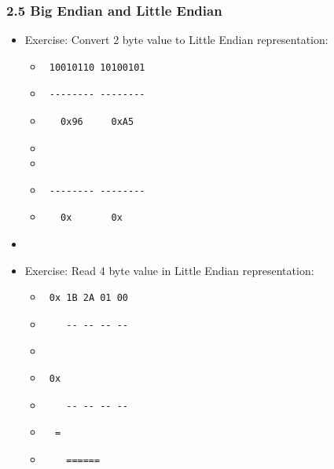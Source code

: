 \begin{frame}[fragile]
  \frametitle{2.5 Big Endian and Little Endian}
    \begin{itemize}
        \item[] Exercise: Convert 2 byte value to Little Endian representation:
            \begin{itemize}
                \item[] \begin{verbatim} 10010110 10100101\end{verbatim}
                \item[] \begin{verbatim} -------- --------\end{verbatim}
                \item[] \begin{verbatim}   0x96     0xA5   \end{verbatim}
                \item[] 
                \item[] 
                \item[] \begin{verbatim} -------- --------\end{verbatim}
                \item[] \begin{verbatim}   0x       0x     \end{verbatim}
            \end{itemize}
        \item[] 
        \item[] Exercise: Read 4 byte value in Little Endian representation:
            \begin{itemize}
                \item[] \begin{verbatim} 0x 1B 2A 01 00\end{verbatim}
                \item[] \begin{verbatim}    -- -- -- --\end{verbatim}
                \item[] 
                \item[] \begin{verbatim} 0x            \end{verbatim}
                \item[] \begin{verbatim}    -- -- -- -- \end{verbatim}
                \item[] \begin{verbatim}  =         \end{verbatim}
                \item[] \begin{verbatim}    ======  \end{verbatim}
            \end{itemize}
    \end{itemize}
\end{frame}


